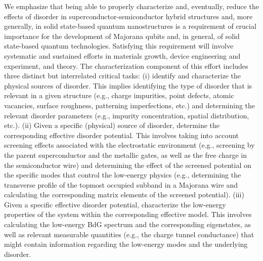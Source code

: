 \documentclass[aps,prmaterials,twocolumn,superscriptaddress,longbibliography]{revtex4-2}
\begin{document}
We emphasize that being able to properly characterize and, eventually, reduce the effects of disorder in superconductor-semiconductor hybrid structures and, more generally, in solid state-based quantum nanostructures is a requirement of crucial importance for the development of Majorana qubits and, in general, of solid state-based quantum technologies.  Satisfying this requirement will involve systematic and sustained efforts in materials growth, device engineering and experiment, and theory. The characterization component of this effort includes three distinct but interrelated critical tasks: (i) identify and characterize the physical sources of disorder. This implies identifying the type of disorder that is relevant in a given structure (e.g., charge impurities, point defects, atomic vacancies, surface roughness, patterning imperfections, etc.) and determining the relevant disorder parameters (e.g., impurity concentration, spatial distribution, etc.). (ii) Given a specific (physical) source of disorder, determine the corresponding effective disorder potential. This involves taking into account screening effects associated with the electrostatic environment (e.g., screening by the parent superconductor and the metallic gates, as well as the free charge in the semiconductor wire) and determining the effect of the screened potential on the specific modes that control the low-energy physics (e.g., determining the transverse profile of the topmost occupied subband in a Majorana wire and calculating the corresponding matrix elements of the screened potential). (iii) Given a specific effective disorder potential, characterize the low-energy properties of the system within the corresponding effective model. This involves calculating the low-energy BdG spectrum and the corresponding eigenstates, as well as relevant measurable quantities (e.g., the charge tunnel conductance) that might contain information regarding the low-energy modes and the underlying disorder.  
\end{document}
